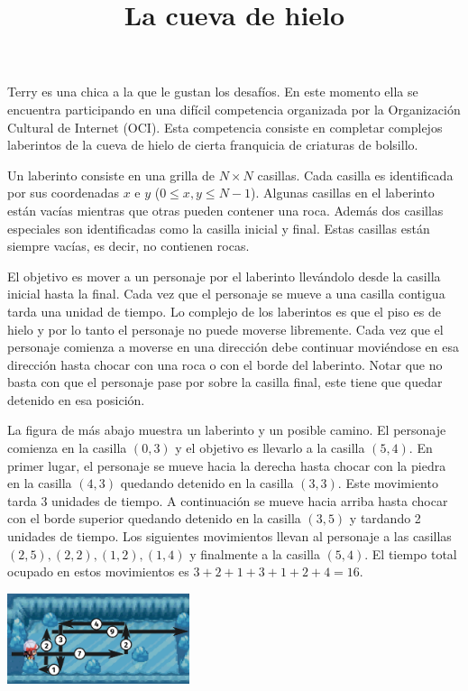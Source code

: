 \documentclass{oci}
\title{La cueva de hielo}
\begin{document}
\maketitle
  Terry es una chica a la que le gustan los desafíos.
En este momento ella se encuentra participando en una difícil competencia organizada por la Organización Cultural de Internet (OCI).
Esta competencia consiste en completar complejos laberintos de la cueva de hielo de cierta franquicia de criaturas de bolsillo.

Un laberinto consiste en una grilla de $N\times N$ casillas.
Cada casilla es identificada por sus coordenadas $x$ e $y$ ($0\leq x,y \leq N-1$).
Algunas casillas en el laberinto están vacías mientras que otras pueden contener una roca.
Además dos casillas especiales son identificadas como la casilla inicial y final.
Estas casillas están siempre vacías, es decir, no contienen rocas.

El objetivo es mover a un personaje por el laberinto llevándolo desde la casilla inicial hasta la final.
Cada vez que el personaje se mueve a una casilla contigua tarda una unidad de tiempo.
Lo complejo de los laberintos es que el piso es de hielo y por lo tanto el personaje no puede moverse libremente.
Cada vez que el personaje comienza a moverse en una dirección debe continuar moviéndose en esa dirección hasta chocar con una roca o con el borde del laberinto.
Notar que no basta con que el personaje pase por sobre la casilla final, este tiene que quedar detenido en esa posición.

La figura de más abajo muestra un laberinto y un posible camino.
El personaje comienza en la casilla $(0, 3)$ y el objetivo es llevarlo a la casilla $(5,4)$.
En primer lugar, el personaje se mueve hacia la derecha hasta chocar con la piedra en la casilla $(4,3)$ quedando detenido en la casilla $(3,3)$.
Este movimiento tarda 3 unidades de tiempo.
A continuación se mueve hacia arriba hasta chocar con el borde superior quedando detenido en la casilla $(3,5)$ y tardando 2 unidades de tiempo.
Los siguientes movimientos llevan al personaje a las casillas $(2,5), (2,2), (1,2), (1,4)$ y finalmente a la casilla $(5,4)$.
El tiempo total ocupado en estos movimientos es $3+2+1+3+1+2+4=16$.

\begin{center}
	\includegraphics[width=0.4\textwidth]{ice2.png}
\end{center}
\end{document}
